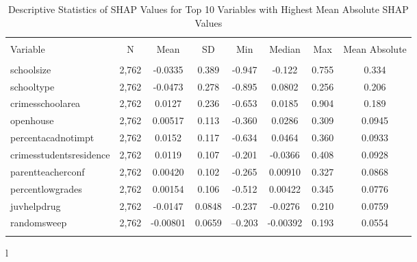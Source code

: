 \documentclass[12pt]{article}
\begin{document}
\begin{landscape}
\begin{table}[!htbp] \centering 
  \caption{Descriptive Statistics of SHAP Values for Top 10 Variables with Highest Mean Absolute SHAP Values} 
  \label{} 
\begin{tabular}{@{\extracolsep{5pt}}lccccccc} 
\\[-1.8ex]\hline 
\hline \\[-1.8ex] 
Variable & \multicolumn{1}{c}{N} & \multicolumn{1}{c}{Mean} & \multicolumn{1}{c}{SD}  & \multicolumn{1}{c}{Min} & \multicolumn{1}{c}{Median} & \multicolumn{1}{c}{Max} & \multicolumn{1}{c}{Mean Absolute}  \\ 
\hline \\[-1.8ex]  
schoolsize & 2,762 & -0.0335 & 0.389 & -0.947 &  -0.122 &  0.755 & 0.334 \\ 
schooltype & 2,762 & -0.0473 & 0.278 & -0.895 &  0.0802 &  0.256 & 0.206 \\ 
crimesschoolarea & 2,762 & 0.0127 & 0.236 & -0.653 &  0.0185 &  0.904 & 0.189 \\ 
openhouse & 2,762 & 0.00517 & 0.113 & -0.360 &  0.0286 &  0.309 & 0.0945 \\ 
percentacadnotimpt & 2,762 & 0.0152 & 0.117 & -0.634 &  0.0464 &  0.360 & 0.0933  \\ 
crimesstudentsresidence & 2,762 & 0.0119 & 0.107 & -0.201 &  -0.0366 &  0.408 & 0.0928 \\ 
parentteacherconf & 2,762 & 0.00420 & 0.102 & -0.265 &  0.00910 &  0.327 & 0.0868 \\ 
percentlowgrades & 2,762 & 0.00154 & 0.106 & -0.512 &  0.00422 &  0.345 & 0.0776 \\ 
juvhelpdrug & 2,762 & -0.0147 & 0.0848 & -0.237 &  -0.0276 &  0.210 & 0.0759  \\ 
randomsweep & 2,762 & -0.00801 & 0.0659 & --0.203 &  -0.00392 &  0.193 & 0.0554  \\ 
\hline \\[-1.8ex] 
\end{tabular} 
\end{table} 
l
\end{landscape}
\end{document}
